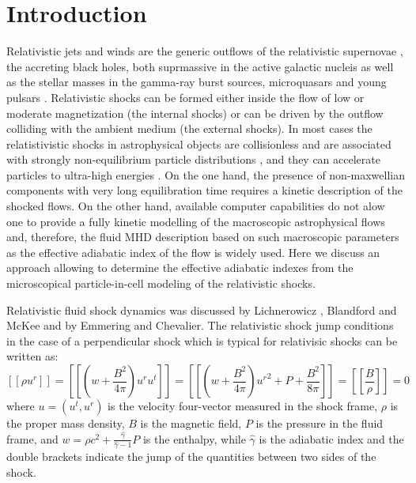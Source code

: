 \documentclass[a4paper]{jpconf}
\begin{document}
	\section{Introduction}
	Relativistic jets and winds are the generic outflows of the relativistic supernovae \cite{2010Natur.463..513S,2007ApJ...667..351W}, the accreting black holes, both suprmassive in the active galactic nucleis  \cite{1984RvMP...56..255B} as well as the stellar masses in the gamma-ray burst sources, microquasars \cite{2019MmSAI..90...57M,1999PhR...314..575P,2014LNP...876.....R} and young pulsars \cite{2017SSRv..207....1B}. Relativistic shocks can be formed either inside the flow of low or moderate magnetization (the internal shocks) or can be driven by the outflow colliding with the ambient medium (the external shocks). In most cases the relatistivistic shocks in astrophysical objects are collisionless and are associated with strongly non-equilibrium particle distributions
	\cite{2012SSRv..173..309B,2015SSRv..191..519S,2017SSRv..207..319P}, and they can accelerate particles to ultra-high energies \cite{2009JCAP...11..009L}. On the one hand, the presence of non-maxwellian components with very long equilibration time requires a kinetic description of the shocked flows. On the other hand, available computer capabilities do not alow one to provide a fully kinetic modelling of the macroscopic astrophysical flows and, therefore, the fluid MHD description based on such macroscopic parameters as the effective adiabatic index of the flow is widely used. Here we discuss an approach allowing to determine the effective adiabatic indexes from the microscopical particle-in-cell modeling of the relativistic shocks.   
	
	Relativistic fluid shock dynamics was discussed by Lichnerowicz \cite{1967rhm..book.....L}, Blandford and McKee \cite{Blandford76} and by Emmering and Chevalier\cite{Emmering87}. The relativistic shock jump conditions in the case of a perpendicular shock which is typical for relativisic shocks can be written as:
	\begin{equation}\label{hugoniot}
	[\![\rho u^r]\!] = [\![ (w + \frac{B^2}{4 \pi})u^r u^t]\!] = [\![(w + \frac{B^2}{4 \pi}){u^r}^2 + P + \frac{B^2}{8 \pi}]\!] = [\![\frac{B}{\rho}]\!] = 0
	\end{equation}
	where $u = (u^t,u^r)$ is the velocity four-vector measured in the shock frame, $\rho$ is the proper mass density, $B$ is the magnetic field, $P$ is the pressure in the fluid frame, and $w = \rho c^2 + \frac{\hat{\gamma}}{\hat{\gamma} - 1} P$ is the enthalpy, while $\hat{\gamma}$ is the adiabatic index and the double brackets indicate the jump of the quantities between two sides of the shock.
	
\end{document}
